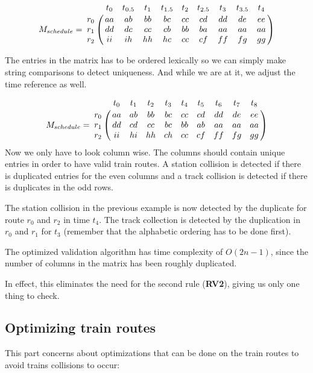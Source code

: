 \documentclass[10pt,a4paper]{article}
\let\bbordermatrix\bordermatrix
\begin{document}
\begin{equation}
M_{schedule} = \bbordermatrix{
                    ~ & t_0 & t_{0.5} & t_1 & t_{1.5} & t_2 & t_{2.5} & t_3 & t_{3.5} & t_4 \cr
                  r_0 & aa  &  ab     & bb  &  bc     & cc  &  cd     & dd  & de      & ee\cr
                  r_1 & dd  &  dc     & cc  &  cb     & bb  &  ba     & aa  & aa      & aa\cr
                  r_2 & ii  &  ih     & hh  &  hc     & cc  &  cf     & ff  & fg      & gg}
\label{eq:sched2}
\end{equation}

The entries in the matrix has to be ordered lexically so we can simply make string comparisons to detect uniqueness. And while we are at it, we adjust the time reference as well.

\begin{equation}
M_{schedule} = \bbordermatrix{
                    ~ & t_0 & t_1 & t_2 & t_3 & t_4 & t_5 & t_6 & t_7 & t_8 \cr
                  r_0 & aa  & ab  & bb  & bc  & cc  & cd  & dd  & de  & ee\cr
                  r_1 & dd  & cd  & cc  & bc  & bb  & ab  & aa  & aa  & aa\cr
                  r_2 & ii  & hi  & hh  & ch  & cc  & cf  & ff  & fg  & gg}
\label{eq:sched3}
\end{equation} 
Now we only have to look column wise. The columns should contain unique entries in order to have valid train routes.
A station collision is detected if there is duplicated entries for the even columns and a track collision is detected if there is duplicates in the odd rows.
 
The station collision in the previous example is now detected by the duplicate for route $r_0$ and $r_2$ in time $t_4$.
The track collection is detected by the duplication in $r_0$ and $r_1$ for $t_3$ (remember that the alphabetic ordering has to be done first).
 
The optimized validation algorithm has time complexity of $O(2n-1)$, since the number of columns in the matrix has been roughly duplicated.

In effect, this eliminates the need for the second rule (\textbf{RV2}), giving us only one thing to check.

\subsection{Optimizing train routes}
 
This part concerns about optimizations that can be done on the train routes to avoid trains collisions to occur:
 
\end{document}
